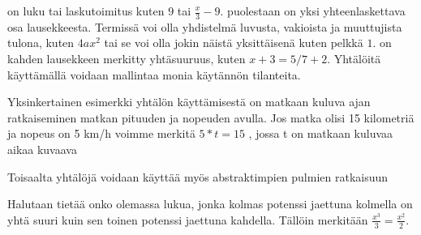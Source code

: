 
 on luku tai laskutoimitus kuten $9$ tai $\frac{x}{3}-9$.  puolestaan on yksi yhteenlaskettava osa lausekkeesta. Termissä voi olla yhdistelmä luvusta, vakioista ja muuttujista tulona, kuten $4ax^2$ tai se voi olla jokin näistä yksittäisenä kuten pelkkä $1$.  on kahden lausekkeen merkitty yhtäsuuruus, kuten $x+3=5/7+2$. Yhtälöitä käyttämällä voidaan mallintaa monia käytännön tilanteita.

\begin{esimerkki}
	Yksinkertainen esimerkki yhtälön käyttämisestä on matkaan kuluva ajan ratkaiseminen matkan pituuden ja nopeuden avulla. Jos matka olisi 15 kilometriä ja nopeus on 5 km/h voimme merkitä $5*t=15$ , jossa t on matkaan kuluvaa aikaa kuvaava 
\end{esimerkki}

Toisaalta yhtälöjä voidaan käyttää myös abstraktimpien pulmien ratkaisuun

\begin{esimerkki}
	Halutaan tietää onko olemassa lukua, jonka kolmas potenssi jaettuna kolmella on yhtä suuri kuin sen toinen potenssi jaettuna kahdella. Tällöin merkitään $\frac{x^3}{3}=\frac{x^2}{2}$. 
\end{esimerkki}


\begin{esimerkki}
	\begin{alakohdat}
	\end{alakohdat}
\end{esimerkki}



